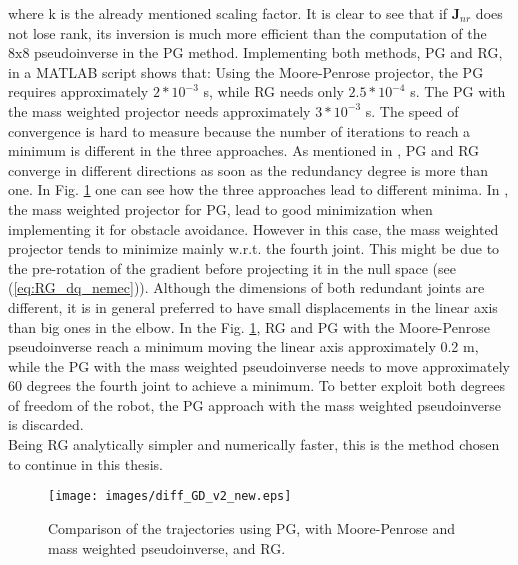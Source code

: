 where $\mathrm{k}$ is the already mentioned scaling factor. It is clear to see that if $\mathbf{J}_{nr}$ does not lose rank, its inversion is much more efficient than the computation of the $\mathrm{8x8}$ pseudoinverse in the PG method. Implementing both methods, PG and RG, in a MATLAB script shows that: Using the Moore-Penrose projector, the PG  requires approximately $2*10^{-3}$ s, while RG  needs only $2.5*10^{-4}$ s. The PG with the mass weighted projector needs approximately $3*10^{-3}$ s. The speed of convergence is hard to measure because the number of iterations to reach a minimum is different in the three approaches.
As mentioned in \cite{reduced_gradient}, PG and RG converge in different directions as soon as the redundancy degree is more than one. In Fig. \ref{fig:diff_GD_v2} one can see how the three approaches lead to different minima.  In \cite{Nemec_2}, the mass weighted projector for PG, lead to good minimization when implementing it for obstacle avoidance.  
However in this case, the mass weighted projector tends to minimize mainly w.r.t. the fourth joint. This might be due to the pre-rotation of the gradient before projecting it in the null space (see (\ref{eq:RG_dq_nemec})). Although the dimensions of both redundant joints are different, it is in general preferred to have small displacements in the linear axis than big ones in the elbow. In the Fig. \ref{fig:diff_GD_v2}, RG and PG with the Moore-Penrose pseudoinverse reach a minimum moving the linear axis approximately 0.2 m, while the PG with the mass weighted pseudoinverse needs to move approximately 60 degrees the fourth joint to achieve a minimum. To better exploit both degrees of freedom of the robot, the PG approach with the mass weighted pseudoinverse is discarded. 
 \\ 
Being RG analytically simpler and numerically faster, this is the method chosen to continue in this thesis. 


\begin{figure}[!htb]
	\centerline{
		\texttt{[image: images/diff\_GD\_v2\_new.eps]}}
	\caption{Comparison of the trajectories using PG, with Moore-Penrose and mass weighted pseudoinverse, and RG.}
	\label{fig:diff_GD_v2}
\end{figure}









%

